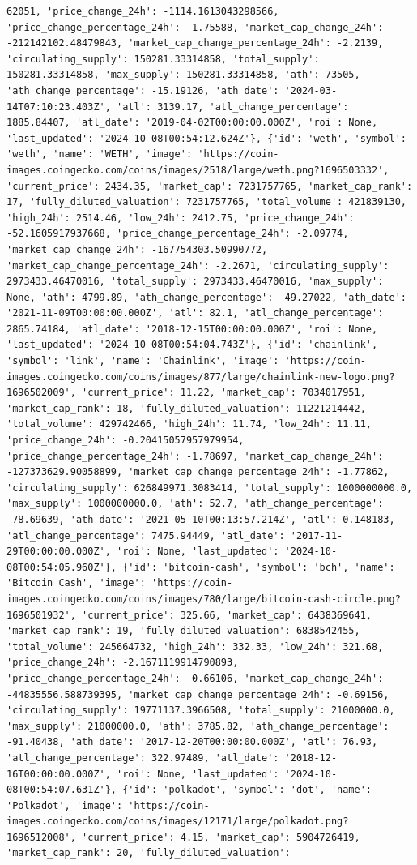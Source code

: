 \documentclass[
  letterpaper,
  DIV=11,
  numbers=noendperiod]{scrreprt}
\begin{document}
\begin{verbatim}
62051, 'price_change_24h': -1114.1613043298566, 'price_change_percentage_24h': -1.75588, 'market_cap_change_24h': -212142102.48479843, 'market_cap_change_percentage_24h': -2.2139, 'circulating_supply': 150281.33314858, 'total_supply': 150281.33314858, 'max_supply': 150281.33314858, 'ath': 73505, 'ath_change_percentage': -15.19126, 'ath_date': '2024-03-14T07:10:23.403Z', 'atl': 3139.17, 'atl_change_percentage': 1885.84407, 'atl_date': '2019-04-02T00:00:00.000Z', 'roi': None, 'last_updated': '2024-10-08T00:54:12.624Z'}, {'id': 'weth', 'symbol': 'weth', 'name': 'WETH', 'image': 'https://coin-images.coingecko.com/coins/images/2518/large/weth.png?1696503332', 'current_price': 2434.35, 'market_cap': 7231757765, 'market_cap_rank': 17, 'fully_diluted_valuation': 7231757765, 'total_volume': 421839130, 'high_24h': 2514.46, 'low_24h': 2412.75, 'price_change_24h': -52.1605917937668, 'price_change_percentage_24h': -2.09774, 'market_cap_change_24h': -167754303.50990772, 'market_cap_change_percentage_24h': -2.2671, 'circulating_supply': 2973433.46470016, 'total_supply': 2973433.46470016, 'max_supply': None, 'ath': 4799.89, 'ath_change_percentage': -49.27022, 'ath_date': '2021-11-09T00:00:00.000Z', 'atl': 82.1, 'atl_change_percentage': 2865.74184, 'atl_date': '2018-12-15T00:00:00.000Z', 'roi': None, 'last_updated': '2024-10-08T00:54:04.743Z'}, {'id': 'chainlink', 'symbol': 'link', 'name': 'Chainlink', 'image': 'https://coin-images.coingecko.com/coins/images/877/large/chainlink-new-logo.png?1696502009', 'current_price': 11.22, 'market_cap': 7034017951, 'market_cap_rank': 18, 'fully_diluted_valuation': 11221214442, 'total_volume': 429742466, 'high_24h': 11.74, 'low_24h': 11.11, 'price_change_24h': -0.20415057957979954, 'price_change_percentage_24h': -1.78697, 'market_cap_change_24h': -127373629.90058899, 'market_cap_change_percentage_24h': -1.77862, 'circulating_supply': 626849971.3083414, 'total_supply': 1000000000.0, 'max_supply': 1000000000.0, 'ath': 52.7, 'ath_change_percentage': -78.69639, 'ath_date': '2021-05-10T00:13:57.214Z', 'atl': 0.148183, 'atl_change_percentage': 7475.94449, 'atl_date': '2017-11-29T00:00:00.000Z', 'roi': None, 'last_updated': '2024-10-08T00:54:05.960Z'}, {'id': 'bitcoin-cash', 'symbol': 'bch', 'name': 'Bitcoin Cash', 'image': 'https://coin-images.coingecko.com/coins/images/780/large/bitcoin-cash-circle.png?1696501932', 'current_price': 325.66, 'market_cap': 6438369641, 'market_cap_rank': 19, 'fully_diluted_valuation': 6838542455, 'total_volume': 245664732, 'high_24h': 332.33, 'low_24h': 321.68, 'price_change_24h': -2.1671119914790893, 'price_change_percentage_24h': -0.66106, 'market_cap_change_24h': -44835556.588739395, 'market_cap_change_percentage_24h': -0.69156, 'circulating_supply': 19771137.3966508, 'total_supply': 21000000.0, 'max_supply': 21000000.0, 'ath': 3785.82, 'ath_change_percentage': -91.40438, 'ath_date': '2017-12-20T00:00:00.000Z', 'atl': 76.93, 'atl_change_percentage': 322.97489, 'atl_date': '2018-12-16T00:00:00.000Z', 'roi': None, 'last_updated': '2024-10-08T00:54:07.631Z'}, {'id': 'polkadot', 'symbol': 'dot', 'name': 'Polkadot', 'image': 'https://coin-images.coingecko.com/coins/images/12171/large/polkadot.png?1696512008', 'current_price': 4.15, 'market_cap': 5904726419, 'market_cap_rank': 20, 'fully_diluted_valuation': 
\end{verbatim}
\end{document}
